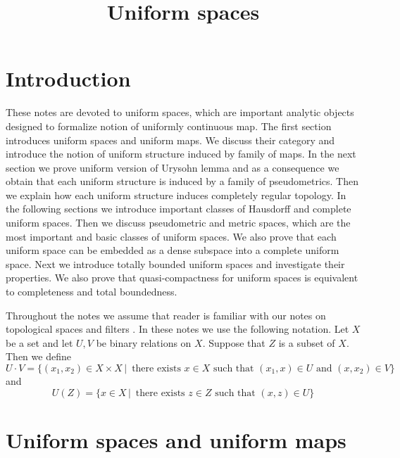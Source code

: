 


\title{Uniform spaces}
\date{}
\maketitle

\section{Introduction}
\noindent
These notes are devoted to uniform spaces, which are important analytic objects designed to formalize notion of uniformly continuous map. The first section introduces uniform spaces and uniform maps. We discuss their category and introduce the notion of uniform structure induced by family of maps. In the next section we prove uniform version of Urysohn lemma and as a consequence we obtain that each uniform structure is induced by a family of pseudometrics. Then we explain how each uniform structure induces completely regular topology. In the following sections we introduce important classes of Hausdorff and complete uniform spaces. Then we discuss pseudometric and metric spaces, which are the most important and basic classes of uniform spaces. We also prove that each uniform space can be embedded as a dense subspace into a complete uniform space. Next we introduce totally bounded uniform spaces and investigate their properties. We also prove that quasi-compactness for uniform spaces is equivalent to completeness and total boundedness.

Throughout the notes we assume that reader is familiar with our notes on topological spaces \cite{Topological_spaces} and filters \cite{Filters_in_topology}. In these notes we use the following notation. Let $X$ be a set and let $U, V$ be binary relations on $X$. Suppose that $Z$ is a subset of $X$. Then we define
$$U \cdot V = \big\{(x_1,x_2) \in X\times X\,\big|\,\mbox{ there exists }x\in X\mbox{ such that }(x_1, x)\in U\mbox{ and }(x,x_2)\in V\big\}$$
and
$$U(Z) = \big\{x \in X\,\big|\,\mbox{ there exists }z\in Z\mbox{ such that }(x, z)\in U\big\}$$


\section{Uniform spaces and uniform maps}

